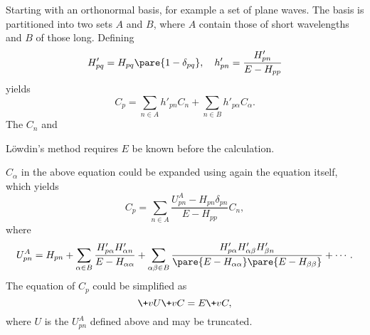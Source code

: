\documentclass[hidelinks]{article}
\begin{document}
Starting with an orthonormal basis, for example a set of plane waves. The basis is partitioned into two sets $A$ and $B$, where $A$ contain those of short wavelengths and $B$ of those long. Defining
\[ H'_{pq} = H_{pq}\pare{1-\delta_{pq}},\quad h'_{pn} = \frac{H'_{pn}}{E-H_{pp}} \]
yields
\[ C_p = \sum_{n\in A}h'_{pn} C_n + \sum_{n\in B} h'_{p\alpha}C_\alpha. \]
The $C_n$ and \begin{marginwarns}
    L\"owdin's method requires $E$ be known before the calculation.
\end{marginwarns} $C_\alpha$ in the above equation could be expanded using again the equation itself, which yields
\[ C_p = \sum_{n\in A} \frac{U_{pn}^A - H_{pn}\delta_{pn}}{E - H_{pp}} C_n, \]
where
\[ U_{pn}^A = H_{pn} + \sum_{\alpha\in B} \frac{H'_{p\alpha}H'_{\alpha n}}{E-H_{\alpha\alpha}} + \sum_{\alpha\beta\in B} \frac{H'_{p\alpha} H'_{\alpha\beta} H'_{\beta n}}{\pare{E - H_{\alpha\alpha}} \pare{E - H_{\beta\beta}}} + \cdots. \]
The equation of $C_p$ could be simplified as
\[ \+vU \+vC = E \+vC, \]
where $U$ is the $U^A_{pn}$ defined above and may be truncated.


\end{document}
